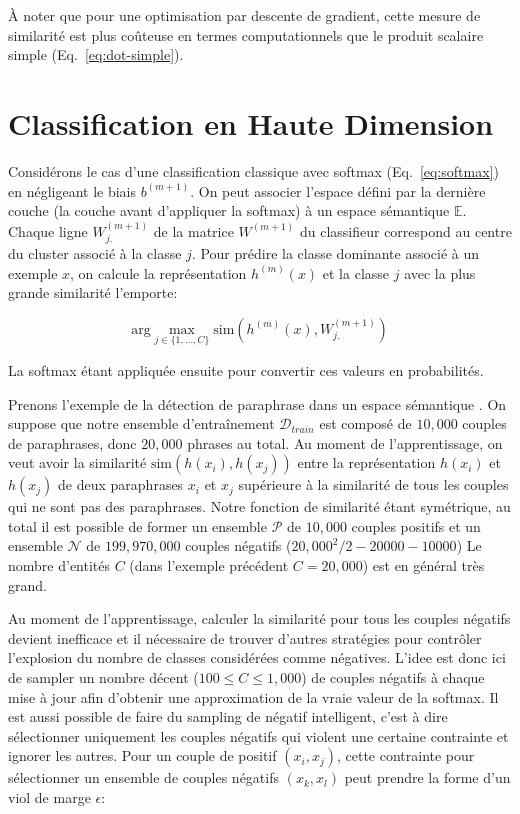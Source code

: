 À noter que pour une optimisation par descente de gradient, cette mesure de
similarité est plus coûteuse en termes computationnels que le produit scalaire
simple (Eq.~\ref{eq:dot-simple}).

\section{Classification en Haute Dimension}
\label{sec:chd}

Considérons le cas d'une classification classique avec softmax
(Eq.~\ref{eq:softmax}) en négligeant le biais $b^{(m+1)}$. On peut associer
l'espace défini par la dernière couche (la couche avant d'appliquer la softmax)
à un espace sémantique $\mathbb{E}$.  Chaque ligne $W^{(m+1)}_{j.}$ de la
matrice $W^{(m+1)}$ du classifieur correspond au centre du cluster associé à
la classe $j$. Pour prédire la classe dominante associé à un exemple $x$, on
calcule la représentation $h^{(m)}(x)$ et la classe $j$ avec la plus grande
similarité l'emporte:

\begin{equation}
\textrm{arg}\max_{j\in\lbrace 1,\dots ,C\rbrace} \textrm{sim}(h^{(m)}(x), W^{(m+1)}_{j.})
\end{equation}

La softmax étant appliquée ensuite pour convertir ces valeurs en probabilités.

Prenons l'exemple de la détection de paraphrase dans un espace sémantique
\citep{msr-paraphrase}. On suppose que notre ensemble d'entraînement
$\mathcal{D}_{train}$ est composé de $10,000$ couples de paraphrases, donc
$20,000$ phrases au total. Au moment de l'apprentissage, on veut avoir la similarité
$\textrm{sim}(h(x_i),h(x_j))$ entre la représentation $h(x_i)$ et $h(x_j)$ de
deux paraphrases $x_i$ et $x_j$ supérieure à la similarité de tous les couples
qui ne sont pas des paraphrases. Notre fonction de similarité étant symétrique,
au total il est possible de former un ensemble $\mathcal{P}$ de $10,000$
couples positifs et un ensemble $\mathcal{N}$ de $199,970,000$ couples négatifs
($20,000^2/2 - 20000 - 10000$) Le nombre d'entités $C$ (dans l'exemple
précédent $C=20,000$) est en général très grand.

Au moment de l'apprentissage, calculer la similarité pour tous les couples
négatifs devient inefficace et il nécessaire de trouver d'autres stratégies
pour contrôler l'explosion du nombre de classes considérées comme négatives.
L'idee est donc ici de sampler un nombre décent ($100\leq C\leq 1,000$) de couples négatifs à chaque
mise à jour afin d'obtenir une approximation de la vraie valeur de la softmax.
Il est aussi possible de faire du sampling de négatif intelligent, c'est à dire
sélectionner uniquement les couples négatifs qui violent une certaine
contrainte et ignorer les autres. Pour un couple de positif $(x_i, x_j)$, cette
contrainte pour sélectionner un ensemble de couples négatifs $(x_k, x_l)$ peut
prendre la forme d'un viol de marge $\epsilon$:

